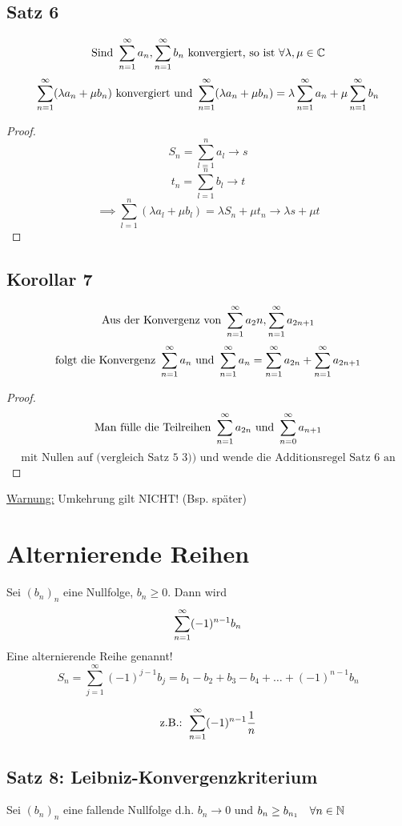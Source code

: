 \subsection{Satz 6}

\[\text{Sind } \sum_{n=1}^{\infty} a_n, \sum_{n=1}^{\infty} b_n \text{  konvergiert, so ist } \forall \lambda, \mu \in \mathbb{C}\]
\[\sum_{n=1}^{\infty} (\lambda a_n + \mu b_n) \text{ konvergiert  und } \sum_{n=1}^{\infty} (\lambda a_n + \mu b_n) = \lambda \sum_{n=1}^{\infty} a_n + \mu \sum_{n=1}^{\infty} b_n \]

\begin{proof}
  \[S_n = \sum_{l=1}^n a_l \to s\]
  \[t_n = \sum_{l=1}^n b_l \to t\]
  \[\implies \sum_{l=1}^n (\lambda a_l + \mu b_l) = \lambda S_n + \mu t_n \to \lambda s + \mu t\]
\end{proof}

\subsection{Korollar 7}

\[\text{Aus der Konvergenz von } \sum_{n=1}^{\infty} a_2n, \sum_{n=1}^{\infty} a_{2n+1}\]
\[\text{folgt die Konvergenz } \sum_{n=1}^{\infty} a_n
\text{ und } \sum_{n=1}^{\infty} a_n = \sum_{n=1}^{\infty} a_{2n} + \sum_{n=1}^{\infty} a_{2n+1}\]

\begin{proof}
  \[\text{Man fülle die Teilreihen } \sum_{n=1}^{\infty} a_{2n} \text{ und } \sum_{n=0}^{\infty} a_{n+1}\]
  \[\text{mit Nullen auf (vergleich Satz 5 3)) und wende die Additionsregel Satz 6 an}\] 
\end{proof}

\underline{Warnung:} Umkehrung gilt NICHT! (Bsp. später)

\section{Alternierende Reihen}

Sei $(b_n)_n$ eine Nullfolge, $b_n \geq 0$. Dann wird
\[\sum_{n=1}^{\infty} (-1)^{n-1} b_n\]
Eine alternierende Reihe genannt!
\[S_n = \sum_{j=1}^\infty (-1)^{j-1} b_j = b_1-b_2+b_3-b_4+\ldots+(-1)^{n-1} b_n\]

\[\text{z.B.: } \sum_{n=1}^{\infty} (-1)^{n-1} \frac{1}{n}\]

\subsection{Satz 8: Leibniz-Konvergenzkriterium}

Sei $(b_n)_n$ eine fallende Nullfolge d.h. $b_n \to 0$ und $b_n \geq b_{n_1} \quad \forall n \in \mathbb{N}$ 

